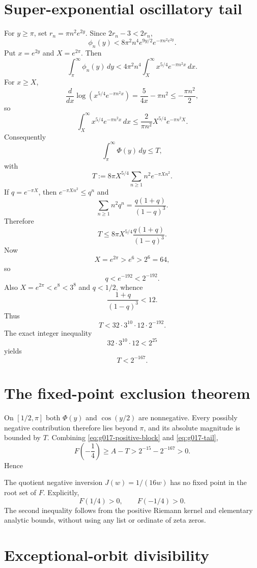 \section{Super-exponential oscillatory tail}

For $y\ge\pi$, set $r_n=\pi n^2e^{2y}$.  Since $2r_n-3<2r_n$,
\[
 \phi_n(y)
 <8\pi^2n^4e^{9y/2}e^{-\pi n^2e^{2y}}.
\]
Put $x=e^{2y}$ and $X=e^{2\pi}$.  Then
\[
 \int_\pi^\infty\phi_n(y)\,dy
 <4\pi^2n^4\int_X^\infty x^{5/4}e^{-\pi n^2x}\,dx.
\]
For $x\ge X$,
\[
 \frac{d}{dx}\log\!\left(x^{5/4}e^{-\pi n^2x}\right)
 =\frac{5}{4x}-\pi n^2
 \le-\frac{\pi n^2}{2},
\]
so
\[
 \int_X^\infty x^{5/4}e^{-\pi n^2x}\,dx
 \le\frac{2}{\pi n^2}X^{5/4}e^{-\pi n^2X}.
\]
Consequently
\[
 \int_\pi^\infty\Phi(y)\,dy\le T,
\]
with
\[
 T:=8\pi X^{5/4}\sum_{n\ge1}n^2e^{-\pi Xn^2}.
\]
If $q=e^{-\pi X}$, then $e^{-\pi Xn^2}\le q^n$ and
\[
 \sum_{n\ge1}n^2q^n=\frac{q(1+q)}{(1-q)^3}.
\]
Therefore
\[
 T\le8\pi X^{5/4}\frac{q(1+q)}{(1-q)^3}.
\]
Now
\[
 X=e^{2\pi}>e^6>2^6=64,
\]
so
\[
 q<e^{-192}<2^{-192}.
\]
Also $X=e^{2\pi}<e^8<3^8$ and $q<1/2$, whence
\[
 \frac{1+q}{(1-q)^3}<12.
\]
Thus
\[
 T<32\cdot3^{10}\cdot12\cdot2^{-192}.
\]
The exact integer inequality
\[
 32\cdot3^{10}\cdot12<2^{25}
\]
yields
\begin{equation}
 \boxed{T<2^{-167}}.
 \label{eq:g017-tail}
\end{equation}

\section{The fixed-point exclusion theorem}

On $[1/2,\pi]$ both $\Phi(y)$ and $\cos(y/2)$ are nonnegative.  Every possibly negative contribution therefore lies beyond $\pi$, and its absolute magnitude is bounded by $T$.  Combining \eqref{eq:g017-positive-block} and \eqref{eq:g017-tail},
\[
 F\!\left(-\frac14\right)
 \ge A-T
 >2^{-15}-2^{-167}
 >0.
\]
Hence
\begin{theorem}
\label{thm:g017-fixed-point-exclusion}
The quotient negative inversion $J(w)=1/(16w)$ has no fixed point in the root set of $F$.  Explicitly,
\[
 F(1/4)>0,
 \qquad
 \boxed{F(-1/4)>0}.
\]
The second inequality follows from the positive Riemann kernel and elementary analytic bounds, without using any list or ordinate of zeta zeros.
\end{theorem}

\section{Exceptional-orbit divisibility}


